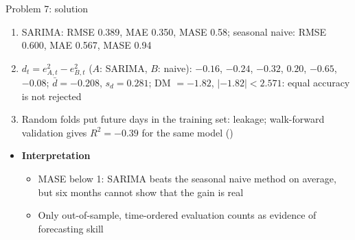 \begin{frame}{Problem 7: solution}
\itemsize{\footnotesize}
\begin{enumerate}
    \item SARIMA: RMSE 0.389, MAE 0.350, MASE 0.58; seasonal naive: RMSE 0.600, MAE 0.567, MASE 0.94
    \item $d_t = e_{A,t}^2 - e_{B,t}^2$ ($A$: SARIMA, $B$: naive): $\ensuremath{-}0.16$, $\ensuremath{-}0.24$, $\ensuremath{-}0.32$, $0.20$, $\ensuremath{-}0.65$, $\ensuremath{-}0.08$; $\bar d = \ensuremath{-}0.208$, $s_d = 0.281$; DM $= \ensuremath{-}1.82$, $|\ensuremath{-}1.82| < 2.571$: equal accuracy is not rejected
    \item Random folds put future days in the training set: leakage; walk-forward validation gives $R^2 = \ensuremath{-}0.39$ for the same model ()
\end{enumerate}
\begin{itemize}
    \item \textbf{Interpretation}
    \begin{itemize}
        \item MASE below 1: SARIMA beats the seasonal naive method on average, but six months cannot show that the gain is real
        \item Only out-of-sample, time-ordered evaluation counts as evidence of forecasting skill
    \end{itemize}
\end{itemize}
\end{frame}

